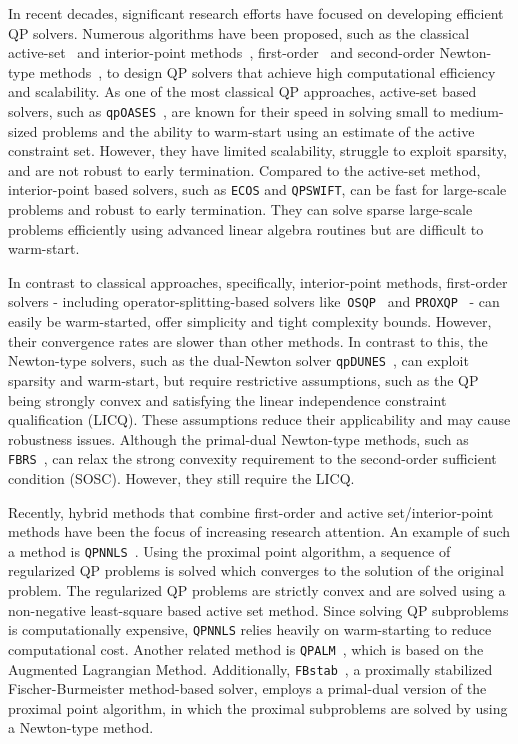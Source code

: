 \documentclass[letterpaper, 10 pt, conference]{ieeeconf}  \IEEEoverridecommandlockouts
\begin{document}
In recent decades, significant research efforts have focused on developing efficient QP solvers. Numerous algorithms have been proposed, such as the classical active-set~\cite{bemporad2015quadratic,cimini2019complexity,ferreau2014qpoases} and interior-point methods~\cite{wright1997,domahidi2013,frison2020hpipm}, first-order~\cite{goldstein2014fast,patrinos2013accelerated,patrinos2015dual,stellato2020} and second-order Newton-type methods~\cite{frasch2015parallel,patrinos2011global}, to design QP solvers that achieve high computational efficiency and scalability. As one of the most classical QP approaches, active-set based solvers, such as \texttt{qpOASES}~\cite{ferreau2014qpoases}, are known for their speed in solving small to medium-sized problems and the ability to warm-start using an estimate of the active constraint set. However, they have limited scalability, struggle to exploit sparsity, and are not robust to early termination. Compared to the active-set method, interior-point based solvers, such as \texttt{ECOS} and \texttt{QPSWIFT}, can be fast for large-scale problems and robust to early termination. They can solve sparse large-scale problems efficiently using advanced linear algebra routines but are difficult to warm-start.

In contrast to classical approaches, specifically, interior-point methods, first-order solvers - including operator-splitting-based solvers like~\texttt{OSQP}~\cite{stellato2020} and \texttt{PROXQP}~\cite{bambade2022} - can easily be warm-started, offer simplicity and tight complexity bounds. However, their convergence rates are slower than other methods. In contrast to this, the Newton-type solvers, such as the dual-Newton solver \texttt{qpDUNES}~\cite{frasch2015parallel}, can exploit sparsity and warm-start, but require restrictive assumptions, such as the QP being strongly convex and satisfying the linear independence constraint qualification (LICQ). These assumptions reduce their applicability and may cause robustness issues. Although the primal-dual Newton-type methods, such as \texttt{FBRS}~\cite{liao2018regularized}, can relax the strong convexity requirement to the second-order sufficient condition (SOSC). However, they still require the LICQ.

Recently, hybrid methods that combine first-order and active set/interior-point methods have been the focus of increasing research attention. An example of such a method is \texttt{QPNNLS}~\cite{bemporad2017numerically}. Using the proximal point algorithm, a sequence of regularized QP problems is solved which converges to the solution of the original problem. The regularized QP problems are strictly convex and are solved using a non-negative least-square based active set method. Since solving QP subproblems is computationally expensive, \texttt{QPNNLS} relies heavily on warm-starting to reduce computational cost. Another related method is \texttt{QPALM}~\cite{hermans2022qpalm}, which is based on the Augmented Lagrangian Method. Additionally, \texttt{FBstab}~\cite{liao2020fbstab}, a proximally stabilized Fischer-Burmeister method-based solver, employs a primal-dual version of the proximal point algorithm, in which the proximal subproblems are solved by using a Newton-type method.
\end{document}
